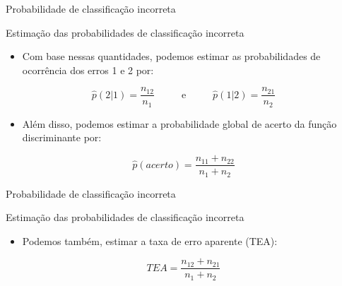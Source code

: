 \documentclass[
  ignorenonframetext,
  aspectratio=169,
]{beamer}
\providecommand{\tightlist}{%
  \setlength{\itemsep}{0pt}\setlength{\parskip}{0pt}}
\begin{document}
\begin{frame}{Probabilidade de classificação incorreta}
\label{probabilidade-de-classificauxe7uxe3o-incorreta-1}
\begin{block}{Estimação das probabilidades de classificação incorreta}
\label{estimauxe7uxe3o-das-probabilidades-de-classificauxe7uxe3o-incorreta-1}
\begin{itemize}
\tightlist
\item
  Com base nessas quantidades, podemos estimar as probabilidades de
  ocorrência dos erros 1 e 2 por:
\end{itemize}

\[\widehat{p}(2|1) = \displaystyle{\frac{n_{12}}{n_1}} \hspace{1cm} \textrm{ e } \hspace{1cm} 
\widehat{p}(1|2) = \displaystyle{\frac{n_{21}}{n_2}}\]

\begin{itemize}
\tightlist
\item
  Além disso, podemos estimar a probabilidade global de acerto da função
  discriminante por:
\end{itemize}

\[\widehat{p}(acerto) = \displaystyle{\frac{n_{11} + n_{22}}{n_1 + n_2}}\]
\end{block}
\end{frame}

\begin{frame}{Probabilidade de classificação incorreta}
\label{probabilidade-de-classificauxe7uxe3o-incorreta-2}
\begin{block}{Estimação das probabilidades de classificação incorreta}
\label{estimauxe7uxe3o-das-probabilidades-de-classificauxe7uxe3o-incorreta-2}
\begin{itemize}
\tightlist
\item
  Podemos também, estimar a taxa de erro aparente (TEA):
\end{itemize}

\[TEA = \displaystyle{\frac{n_{12} + n_{21}}{n_1 + n_2}}\]
\end{block}
\end{frame}
\end{document}
